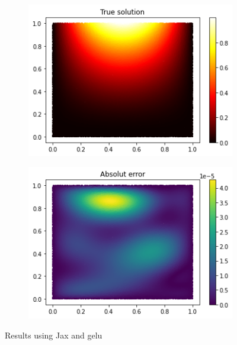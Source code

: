 \begin{figure}[H]
\begin{subfigure}{.45\textwidth}
    \includegraphics[width=.8\linewidth]{images/NN_Jax_PDE8_files_gelu/NN_Jax_PDE8_22_0.png}
    \label{fig:sub3}
    \end{subfigure}
\begin{subfigure}{.45\textwidth}
    \centering
    \includegraphics[width=.8\linewidth]{images/NN_Jax_PDE8_files_gelu/NN_Jax_PDE8_24_0.png}
    \label{fig:sub4}
\end{subfigure}
\caption{Results using Jax and gelu}
\label{fig:test}
\end{figure}

\newpage
\vspace{-0.5cm}
